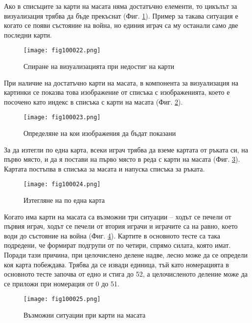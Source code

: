 Ако в списъците за карти на масата няма достатъчно елементи, то цикълът за визуализация трябва да бъде прекъснат (Фиг. \ref{fig100022}). Пример за такава ситуация е когато се появи състояние на война, но единия играч са му останали само две последни карти.

\begin{figure}[H]
  \centering
  \texttt{[image: fig100022.png]}
  \caption{Спиране на визуализацията при недостиг на карти}
\label{fig100022}
\end{figure}

При наличие на достатъчно карти на масата, в компонента за визуализация на картинки се показва това изображение от списъка с изображенията, което е посочено като индекс в списъка с карти на масата (Фиг. \ref{fig100023}).

\begin{figure}[H]
  \centering
  \texttt{[image: fig100023.png]}
  \caption{Определяне на кои изображения да бъдат показани}
\label{fig100023}
\end{figure}

За да изтегли по една карта, всеки играч трябва да вземе картата от ръката си, на първо място, и да я постави на първо място в реда с карти на масата (Фиг. \ref{fig100024}). Картата постъпва в списъка за масата и напуска списъка за ръката.

\begin{figure}[H]
  \centering
  \texttt{[image: fig100024.png]}
  \caption{Изтегляне на по една карта}
\label{fig100024}
\end{figure}

Когато има карти на масата са възможни три ситуации – ходът се печели от първия играч, ходът се печели от втория играчи и играчите са на равно, което води до състояние на война (Фиг. \ref{fig100025}). Картите в основното тесте са така подредени, че формират подгрупи от по четири, спрямо силата, която имат. Поради тази причина, при целочислено делене надве, лесно може да се определи коя карта побеждава. Трябва да се извади единица, тъй като номерацията в основното тесте започва от едно и стига до 52, а целочисленото деление може да се приложи при номерация от 0 до 51. 

\begin{figure}[H]
  \centering
  \texttt{[image: fig100025.png]}
  \caption{Възможни ситуации при карти на масата}
\label{fig100025}
\end{figure}


